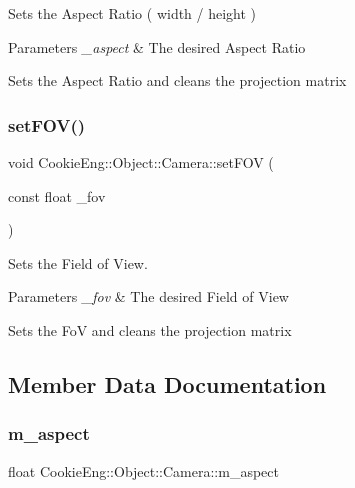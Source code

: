 Sets the Aspect Ratio ( width / height ) 


\begin{DoxyParams}{Parameters}
{\em \+\_\+aspect} & The desired Aspect Ratio\\
\hline
\end{DoxyParams}
Sets the Aspect Ratio and cleans the projection matrix \mbox{\label{class_cookie_eng_1_1_object_1_1_camera_aef44a3e6cef1540be7e8bcb977dddd78}} 
\subsubsection{\texorpdfstring{set\+F\+O\+V()}{setFOV()}}
{\footnotesize\ttfamily void Cookie\+Eng\+::\+Object\+::\+Camera\+::set\+F\+OV (\begin{DoxyParamCaption}\item[{const float}]{\+\_\+fov }\end{DoxyParamCaption})\hspace{0.3cm}{\ttfamily [inline]}}



Sets the Field of View. 


\begin{DoxyParams}{Parameters}
{\em \+\_\+fov} & The desired Field of View\\
\hline
\end{DoxyParams}
Sets the FoV and cleans the projection matrix 

\subsection{Member Data Documentation}
\mbox{\label{class_cookie_eng_1_1_object_1_1_camera_a86c6f04a4f39bfa931493b1f6b9c013c}} 
\subsubsection{\texorpdfstring{m\+\_\+aspect}{m\_aspect}}
{\footnotesize\ttfamily float Cookie\+Eng\+::\+Object\+::\+Camera\+::m\+\_\+aspect\hspace{0.3cm}{\ttfamily [protected]}}

